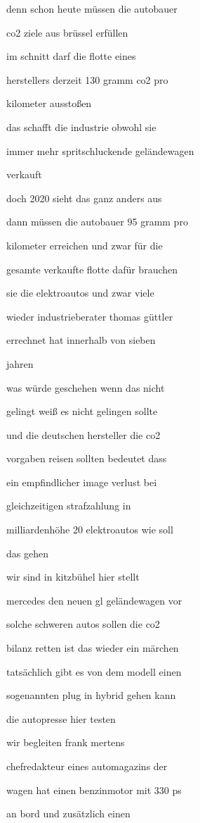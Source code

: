 \documentclass[a4paper, 11pt]{book} %
\begin{document}
denn schon heute müssen die autobauer

co2 ziele aus brüssel erfüllen

im schnitt darf die flotte eines

herstellers derzeit 130 gramm co2 pro

kilometer ausstoßen

das schafft die industrie obwohl sie

immer mehr spritschluckende geländewagen

verkauft

doch 2020 sieht das ganz anders aus

dann müssen die autobauer 95 gramm pro

kilometer erreichen und zwar für die

gesamte verkaufte flotte dafür brauchen

sie die elektroautos und zwar viele

wieder industrieberater thomas güttler

errechnet hat innerhalb von sieben

jahren

was würde geschehen wenn das nicht

gelingt weiß es nicht gelingen sollte

und die deutschen hersteller die co2

vorgaben reisen sollten bedeutet dass

ein empfindlicher image verlust bei

gleichzeitigen strafzahlung in

milliardenhöhe 20 elektroautos wie soll

das gehen

wir sind in kitzbühel hier stellt

mercedes den neuen gl geländewagen vor

solche schweren autos sollen die co2

bilanz retten ist das wieder ein märchen

tatsächlich gibt es von dem modell einen

sogenannten plug in hybrid gehen kann

die autopresse hier testen

wir begleiten frank mertens

chefredakteur eines automagazins der

wagen hat einen benzinmotor mit 330 ps

an bord und zusätzlich einen
\end{document}
